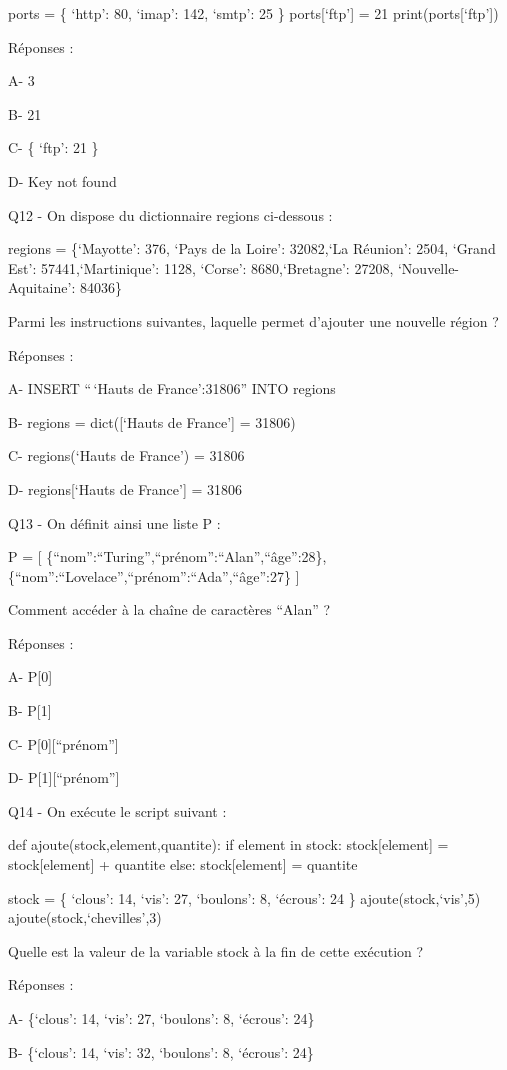 \documentclass[
]{book}
\begin{document}
ports = \{ `http': 80, `imap': 142, `smtp': 25 \}
ports{[}`ftp'{]} = 21
print(ports{[}`ftp'{]})

Réponses :

A- 3

B- 21

C- \{ `ftp': 21 \}

D- Key not found

Q12 - On dispose du dictionnaire regions ci-dessous :

regions = \{`Mayotte': 376, `Pays de la Loire': 32082,`La Réunion': 2504, `Grand Est': 57441,`Martinique': 1128, `Corse': 8680,`Bretagne': 27208, `Nouvelle-Aquitaine': 84036\}

Parmi les instructions suivantes, laquelle permet d'ajouter une nouvelle région ?

Réponses :

A- INSERT ``\,`Hauts de France':31806'' INTO regions

B- regions = dict({[}`Hauts de France'{]} = 31806)

C- regions(`Hauts de France') = 31806

D- regions{[}`Hauts de France'{]} = 31806

Q13 - On définit ainsi une liste P :

P = {[} \{``nom'':``Turing'',``prénom'':``Alan'',``âge'':28\},\{``nom'':``Lovelace'',``prénom'':``Ada'',``âge'':27\} {]}

Comment accéder à la chaîne de caractères ``Alan'' ?

Réponses :

A- P{[}0{]}

B- P{[}1{]}

C- P{[}0{]}{[}``prénom''{]}

D- P{[}1{]}{[}``prénom''{]}

Q14 - On exécute le script suivant :

def ajoute(stock,element,quantite):
if element in stock:
stock{[}element{]} = stock{[}element{]} + quantite
else:
stock{[}element{]} = quantite

stock = \{ `clous': 14, `vis': 27, `boulons': 8, `écrous': 24 \}
ajoute(stock,`vis',5)
ajoute(stock,`chevilles',3)

Quelle est la valeur de la variable stock à la fin de cette exécution ?

Réponses :

A- \{`clous': 14, `vis': 27, `boulons': 8, `écrous': 24\}

B- \{`clous': 14, `vis': 32, `boulons': 8, `écrous': 24\}
\end{document}
